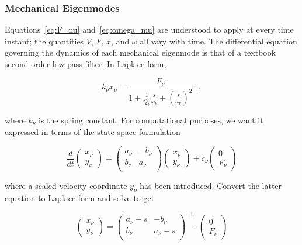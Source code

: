 \documentclass[a4paper,12pt]{article}
\begin{document}
\subsubsection{Mechanical Eigenmodes}

Equations~\ref{eq:F_nu} and~\ref{eq:omega_mu} are understood to apply at every time instant; the quantities $V$, $F$, $x$, and $\omega$ all vary with time. The differential equation governing the dynamics of each mechanical eigenmode is that of a textbook second order low-pass filter.  In Laplace form,

\begin{equation}
k_\nu x_\nu = \frac{F_\nu}{ \displaystyle 1 + \frac{1}{Q_\nu}\frac{s}{\omega_\nu} + \left(\frac{s}{\omega_\nu}\right)^2}~~~,
\end{equation}

\noindent where $k_\nu$ is the spring constant. For computational purposes, we want it expressed in terms of the state-space formulation

\begin{equation}
\frac{d}{dt} \begin{pmatrix}
              x_{\nu} \\
              y_{\nu}
             \end{pmatrix}
             = \begin{pmatrix}
                a_{\nu} & -b_{\nu} \\
                b_{\nu} & a_{\nu} \\
               \end{pmatrix}
               \begin{pmatrix}
                x_{\nu}\\
                y_{\nu}
               \end{pmatrix}
               +c_{\nu} \begin{pmatrix}
                  0 \\
                  F_{\nu}
                 \end{pmatrix}
\label{eq: state_space}
\end{equation}

\noindent where a scaled velocity coordinate $y_{\nu}$ has been introduced. Convert the latter equation to Laplace form and solve to get

\begin{equation}
  \begin{pmatrix}
    x_{\nu} \\
    y_{\nu}
  \end{pmatrix}
  =
  \begin{pmatrix}
    a_{\nu}-s& -b_{\nu} \\
    b_{\nu} & a_{\nu}-s \\
   \end{pmatrix}^{-1}
   \cdot
   \begin{pmatrix}
     0 \\
     F_{\nu}
  \end{pmatrix}
\end{equation}
\end{document}
